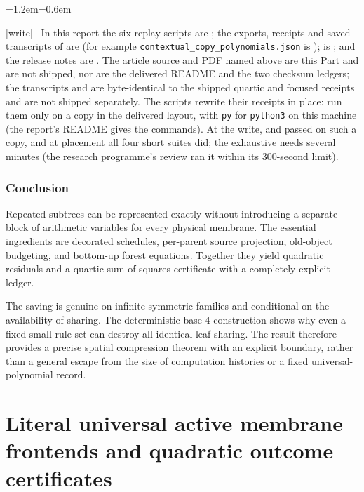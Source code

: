 \documentclass[11pt,letterpaper]{article}
\theoremstyle{definition}
\theoremstyle{remark}
\newcommand{\file}[1]{\nolinkurl{#1}}
\newcommand{\wtag}{\textup{[write]}}
\newenvironment{writenote}{\par\smallskip\begin{list}{}{\leftmargin=1.2em\rightmargin=0.6em}\item[]\small\wtag\ }{\end{list}\smallskip}
\begin{document}
\begin{writenote}
In this report the six replay scripts  are ; the exports, receipts and saved transcripts of  are  (for example \file{contextual_copy_polynomials.json} is );  is ; and the release notes are . The article source and PDF named above are this Part and are not shipped, nor are the delivered README and the two checksum ledgers; the transcripts  and  are byte-identical to the shipped quartic and focused receipts and are not shipped separately. The scripts rewrite their receipts in place: run them only on a copy in the delivered layout, with \texttt{py} for \texttt{python3} on this machine (the report's README gives the commands). At the write,  and  passed on such a copy, and at placement all four short suites did; the exhaustive  needs several minutes (the research programme's review ran it within its 300-second limit).
\end{writenote}


\section{Conclusion}\label{qoc:mm:sec:conclusion}
Repeated subtrees can be represented exactly without introducing a separate block of arithmetic variables for every physical membrane. The essential ingredients are decorated schedules, per-parent source projection, old-object budgeting, and bottom-up forest equations. Together they yield quadratic residuals and a quartic sum-of-squares certificate with a completely explicit ledger.

The saving is genuine on infinite symmetric families and conditional on the availability of sharing. The deterministic base-4 construction shows why even a fixed small rule set can destroy all identical-leaf sharing. The result therefore provides a precise spatial compression theorem with an explicit boundary, rather than a general escape from the size of computation histories or a fixed universal-polynomial record.

\clearpage
\part{Literal universal active membrane frontends and quadratic outcome certificates}\label{qoc:um:part}
\end{document}
